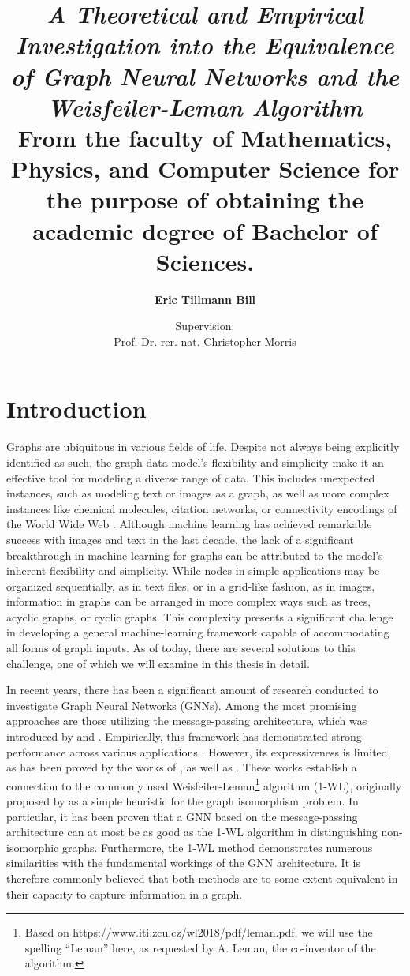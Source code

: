 \documentclass[11pt, dvipsnames, DIV=12]{scrreprt}
\title{\emph{A Theoretical and Empirical Investigation into the Equivalence of Graph Neural Networks and the Weisfeiler-Leman Algorithm}\\
\vspace{20pt}\small{\normalfont From the faculty of Mathematics, Physics, and Computer Science for the purpose of obtaining the academic degree of Bachelor of Sciences.}
}
\author{\textbf{Eric Tillmann Bill}}
\affil{\vspace{100pt}}
\author{Supervision:\\Prof. Dr. rer. nat. Christopher Morris}
\affil{Informatik 6\\RWTH Aachen University}
\date{\vspace{-30pt}}
\theoremstyle{definition}
\begin{document}
\maketitle
\tableofcontents
\newpage



\section{Introduction}
Graphs are ubiquitous in various fields of life. Despite not always being explicitly identified as such, the graph data model's flexibility and simplicity make it an effective tool for modeling a diverse range of data. This includes unexpected instances, such as modeling text or images as a graph, as well as more complex instances like chemical molecules, citation networks, or connectivity encodings of the World Wide Web \cite{Mor+2020, Sca+2009}.
Although machine learning has achieved remarkable success with images and text in the last decade, the lack of a significant breakthrough in machine learning for graphs can be attributed to the model's inherent flexibility and simplicity. While nodes in simple applications may be organized sequentially, as in text files, or in a grid-like fashion, as in images, information in graphs can be arranged in more complex ways such as trees, acyclic graphs, or cyclic graphs. This complexity presents a significant challenge in developing a general machine-learning framework capable of accommodating all forms of graph inputs. As of today, there are several solutions to this challenge, one of which we will examine in this thesis in detail.

In recent years, there has been a significant amount of research conducted to investigate Graph Neural Networks (GNNs). Among the most promising approaches are those utilizing the message-passing architecture, which was introduced by \cite{Gil+2017} and \cite{Sca+2009}. Empirically, this framework has demonstrated strong performance across various applications \cite{Kip+2017, Ham+2017, Xu2018}. However, its expressiveness is limited, as has been proved by the works of \cite{Morris2018}, as well as \cite{Xu2018}. These works establish a connection to the commonly used Weisfeiler-Leman\footnote{Based on https://www.iti.zcu.cz/wl2018/pdf/leman.pdf, we will use the spelling ``Leman'' here, as requested by A. Leman, the co-inventor of the algorithm.} algorithm (1-WL), originally proposed by \cite{Wei+1968} as a simple heuristic for the graph isomorphism problem. In particular, it has been proven that a GNN based on the message-passing architecture can at most be as good as the 1-WL algorithm in distinguishing non-isomorphic graphs. Furthermore, the 1-WL method demonstrates numerous similarities with the fundamental workings of the GNN architecture. It is therefore commonly believed that both methods are to some extent equivalent in their capacity to capture information in a graph.
\end{document}
